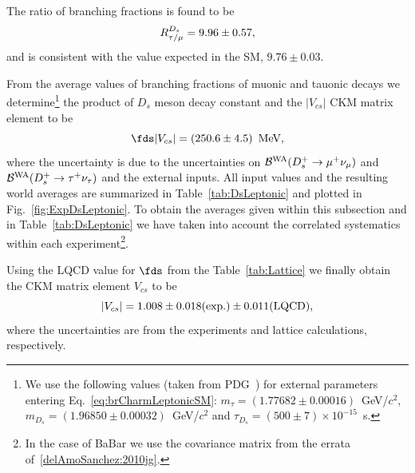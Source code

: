 The ratio of branching fractions is found to be
\[
R_{\tau/\mu}^{D_{s}} = 9.96\pm0.57,
\]
and is consistent with the value expected in the SM, $9.76\pm0.03$.

From the average values of branching fractions of muonic and tauonic decays we determine\footnote{
We use the following values (taken from PDG~\cite{PDG_2012}) for external parameters entering 
Eq.~\ref{eq:brCharmLeptonicSM}: $m_{\tau} = (1.77682\pm0.00016)$~GeV/$c^2$, $m_{D_s} = (1.96850\pm0.00032)$~GeV/$c^2$ 
and $\tau_{D_s} = (500\pm7)\times 10^{-15}$~s.} the product of $D_s$ meson decay constant and 
the $|V_{cs}|$ CKM matrix element to be
\begin{equation}
 \fds|V_{cs}|=\left(250.6\pm4.5\right)~\mbox{MeV},
 \label{eq:expFDSVCS}
\end{equation}
where the uncertainty is due to the uncertainties on ${\cal B}^{\rm WA}(D_s^+\to\mu^+\nu_{\mu})$ and 
${\cal B}^{\rm WA}(D_s^+\to\tau^+\nu_{\tau})$ and the external inputs. All input values and the resulting world averages are 
summarized in Table~\ref{tab:DsLeptonic} and plotted in Fig.~\ref{fig:ExpDsLeptonic}. To obtain the 
averages given within this subsection and in Table~\ref{tab:DsLeptonic} we have taken into account
the correlated systematics within each experiment\footnote{In the case of BaBar we use the covariance matrix from the errata of~\ref{delAmoSanchez:2010jg}.}.

Using the LQCD value for $\fds$ from the Table~\ref{tab:Lattice} we 
finally obtain the CKM matrix element $V_{cs}$ to be
\[
 |V_{cs}| = 1.008\pm0.018(\rm exp.)\pm0.011(\rm LQCD),
\]
where the uncertainties are from the experiments and lattice calculations, respectively.

